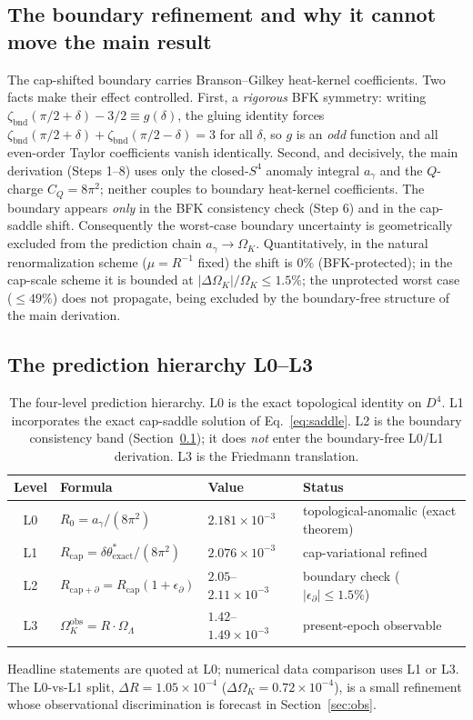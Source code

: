 \documentclass[11pt,a4paper]{article}
\theoremstyle{plain}
\theoremstyle{definition}
\theoremstyle{remark}
\newcommand{\Ok}{\Omega_K}
\newcommand{\OL}{\Omega_\Lambda}
\newcommand{\ag}{a_\gamma}
\newcommand{\CQ}{C_Q}
\newcommand{\dtheta}{\delta\theta}
\begin{document}
\subsection{The boundary refinement and why it cannot move the main result}
\label{sec:boundary}
The cap-shifted boundary carries Branson--Gilkey heat-kernel coefficients. Two facts make their
effect controlled. First, a \emph{rigorous} BFK symmetry: writing
$\zeta_{\mathrm{bnd}}(\pi/2+\delta) - 3/2 \equiv g(\delta)$, the gluing identity forces
$\zeta_{\mathrm{bnd}}(\pi/2+\delta)+\zeta_{\mathrm{bnd}}(\pi/2-\delta) = 3$ for all $\delta$, so
$g$ is an \emph{odd} function and all even-order Taylor coefficients vanish identically. Second,
and decisively, the main derivation (Steps 1--8) uses only the closed-$S^4$ anomaly integral
$\ag$ and the $Q$-charge $\CQ = 8\pi^2$; neither couples to boundary heat-kernel coefficients.
The boundary appears \emph{only} in the BFK consistency check (Step 6) and in the cap-saddle
shift. Consequently the worst-case boundary uncertainty is geometrically excluded from the
prediction chain $\ag \to \Ok$. Quantitatively, in the natural renormalization scheme
($\mu = R^{-1}$ fixed) the shift is $0\%$ (BFK-protected); in the cap-scale scheme it is bounded
at $|\Delta\Ok|/\Ok \le 1.5\%$; the unprotected worst case ($\le 49\%$) does not propagate,
being excluded by the boundary-free structure of the main derivation.

\subsection{The prediction hierarchy L0--L3}
\begin{table}[h]
\centering
\renewcommand{\arraystretch}{1.3}
\begin{tabular}{@{}c l l l@{}}
\toprule
\textbf{Level} & \textbf{Formula} & \textbf{Value} & \textbf{Status} \\
\midrule
L0 & $R_0 = \ag/(8\pi^2)$ & $2.181\times 10^{-3}$ & topological-anomalic (exact theorem) \\
L1 & $R_{\mathrm{cap}} = \dtheta^*_{\mathrm{exact}}/(8\pi^2)$ & $2.076\times 10^{-3}$ & cap-variational refined \\
L2 & $R_{\mathrm{cap}+\partial} = R_{\mathrm{cap}}(1+\epsilon_\partial)$ & $2.05$--$2.11\times 10^{-3}$ & boundary check ($|\epsilon_\partial| \le 1.5\%$) \\
L3 & $\Ok^{\mathrm{obs}} = R\cdot\OL$ & $1.42$--$1.49\times 10^{-3}$ & present-epoch observable \\
\bottomrule
\end{tabular}
\caption{The four-level prediction hierarchy. L0 is the exact topological identity on $D^4$. L1
incorporates the exact cap-saddle solution of Eq.~\eqref{eq:saddle}. L2 is the boundary
consistency band (Section~\ref{sec:boundary}); it does \emph{not} enter the boundary-free L0/L1
derivation. L3 is the Friedmann translation.}
\label{tab:hierarchy}
\end{table}
\noindent
Headline statements are quoted at L0; numerical data comparison uses L1 or L3. The L0-vs-L1
split, $\Delta R = 1.05\times 10^{-4}$ ($\Delta\Ok = 0.72\times 10^{-4}$), is a small refinement
whose observational discrimination is forecast in Section~\ref{sec:obs}.
\end{document}
